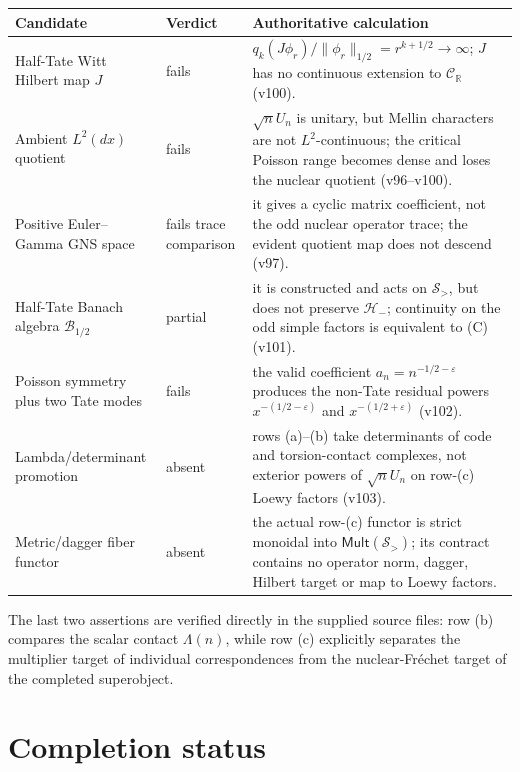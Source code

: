 \documentclass[11pt]{article}
\begin{document}
\begin{center}
\begin{tabular}{>{\raggedright\arraybackslash}p{.29\linewidth}
                >{\centering\arraybackslash}p{.14\linewidth}
                >{\raggedright\arraybackslash}p{.47\linewidth}}
\toprule
Candidate & Verdict & Authoritative calculation \\
\midrule
Half-Tate Witt Hilbert map $J$ & fails &
$q_k(J\phi_r)/\|\phi_r\|_{1/2}=r^{k+1/2}\to\infty$; $J$ has no continuous
extension to $\mathcal C_{\mathbb R}$ (v100). \\
Ambient $L^2(dx)$ quotient & fails &
$\sqrt nU_n$ is unitary, but Mellin characters are not $L^2$-continuous;
the critical Poisson range becomes dense and loses the nuclear quotient
(v96--v100). \\
Positive Euler--Gamma GNS space & fails trace comparison &
it gives a cyclic matrix coefficient, not the odd nuclear operator trace;
the evident quotient map does not descend (v97). \\
Half-Tate Banach algebra $\mathcal B_{1/2}$ & partial &
it is constructed and acts on $\mathcal S_>$, but does not preserve
$\mathcal H_-$; continuity on the odd simple factors is equivalent to (C)
(v101). \\
Poisson symmetry plus two Tate modes & fails &
the valid coefficient $a_n=n^{-1/2-\varepsilon}$ produces the non-Tate
residual powers $x^{-(1/2-\varepsilon)}$ and
$x^{-(1/2+\varepsilon)}$ (v102). \\
Lambda/determinant promotion & absent &
rows (a)--(b) take determinants of code and torsion-contact complexes, not
exterior powers of $\sqrt nU_n$ on row-(c) Loewy factors (v103). \\
Metric/dagger fiber functor & absent &
the actual row-(c) functor is strict monoidal into
$\mathsf{Mult}(\mathcal S_>)$; its contract contains no operator norm,
dagger, Hilbert target or map to Loewy factors. \\
\bottomrule
\end{tabular}
\end{center}

The last two assertions are verified directly in the supplied source
files: row (b) compares the scalar contact $\Lambda(n)$, while row (c)
explicitly separates the multiplier target of individual correspondences
from the nuclear-Fr\'echet target of the completed superobject.

\section{Completion status}
\end{document}
